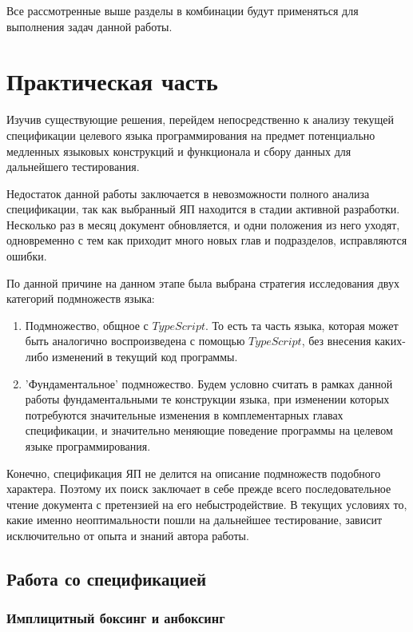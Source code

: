 \documentclass{mipt-thesis-bs}
\begin{document}
Все рассмотренные выше разделы в комбинации будут применяться для выполнения задач 
данной работы.

\chapter{Практическая часть}

Изучив существующие решения, перейдем непосредственно к анализу текущей спецификации
целевого языка программирования на предмет потенциально медленных языковых конструкций и функционала и
сбору данных для дальнейшего тестирования.

Недостаток данной работы заключается в невозможности полного анализа спецификации, так как 
выбранный ЯП находится в стадии активной разработки. Несколько раз в месяц документ обновляется, и одни 
положения из него уходят, одновременно с тем как приходит много новых глав и подразделов, исправляются 
ошибки.

По данной причине на данном этапе была выбрана стратегия исследования двух категорий 
подмножеств языка:

\begin{enumerate}
    \item Подмножество, общное с $TypeScript$. То есть та часть языка, которая может быть аналогично 
    воспроизведена с помощью $TypeScript$, без внесения каких-либо изменений в текущий код программы.
    \item 'Фундаментальное' подмножество. Будем условно считать в рамках данной работы фундаментальными
    те конструкции языка, при изменении которых потребуются значительные изменения в
    комплементарных главах спецификации, и значительно меняющие поведение 
    программы на целевом языке программирования.
\end{enumerate}

Конечно, спецификация ЯП не делится на описание подмножеств подобного характера. Поэтому их поиск 
заключает в себе прежде всего последовательное чтение документа с претензией на его небыстродействие.
В текущих условиях то, какие именно неоптимальности пошли на дальнейшее тестирование, зависит
исключительно от опыта и знаний автора работы.

\section{Работа со спецификацией}

\subsection{Имплицитный боксинг и анбоксинг}
\end{document}
